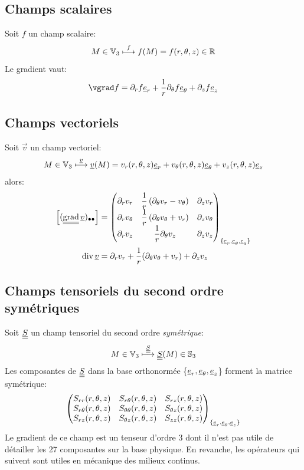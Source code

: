 \documentclass[10pt]{book}
\begin{document}
\begin{appendices}
\subsection{Champs scalaires}
Soit $f$ un champ scalaire:
$$M\in \mathbb{V}_{3}\overset{f}{\longmapsto}f(M)=f(r,\theta,z)\in \mathbb{R}$$
Le gradient vaut:
$$\vgrad f=\partial_{r}f\er+\frac{1}{r}\partial_{\theta}f\etheta+\partial_{z}f\ez$$
\subsection{Champs vectoriels}
Soit $\vec{v}$ un champ vectoriel:
$$M\in \mathbb{V}_{3}\overset{\underline{v}}{\longmapsto}\underline{v}(M)=v_{r}(r,\theta,z)\underline{e}_{r} +v_{\theta}(r,\theta,z)\underline{e}_{\theta}+v_{z}(r,\theta,z)\underline{e}_{z}$$
alors:
\begin{equation}
\begin{aligned}
\left[(\tgrad \vec{v})_{\bullet\bullet}\right]&=
\begin{pmatrix}
\partial_{r}v_{r} & \dfrac{1}{r}\left(\partial_{\theta}v_{r}-v_{\theta}\right) & \partial_{z}v_{r}\\
\partial_{r}v_{\theta}& \dfrac{1}{r}\left(\partial_{\theta}v_{\theta}+v_{r}\right)& \partial_{z}v_{\theta}\\
\partial_{r}v_{z}& \dfrac{1}{r}\partial_{\theta}v_{z} & \partial_{z}v_{z}\\
\end{pmatrix}_{\{\er,\etheta,\ez\}}
\\
\div\vec{v}&=\partial_{r}v_{r}+\frac{1}{r} (\partial_{\theta} \vtheta+v_{r})+\partial_{z}v_{z}
\end{aligned}
\label{eq:formulaire_grad_cyl_vec}
\end{equation}
\subsection{Champs tensoriels du second ordre symétriques}
Soit $\underline{\underline{S}}$ un champ tensoriel du second ordre \emph{symétrique}:
$$M\in \mathbb{V}_{3}\overset{\underline{\underline{S}}}{\longmapsto} \underline{\underline{S}}(M)\in \mathbb{S}_{3}$$
Les composantes de $\underline{\underline{S}}$ dans la base orthonormée \{$\underline{e}_{r},\underline{e}_{\theta}, \underline{e}_{z}$\} forment la matrice symétrique:
$$\begin{pmatrix}
S_{rr}(r,\theta,z) & S_{r\theta}(r,\theta,z) & S_{rz}(r,\theta,z)\\
S_{r\theta}(r,\theta,z) & S_{\theta\theta}(r,\theta,z) & S_{\theta z}(r,\theta,z)\\
S_{rz}(r,\theta,z) & S_{\theta z}(r,\theta,z) & S_{zz}(r,\theta,z)
\end{pmatrix}_{\{\underline{e}_{r},\underline{e}_{\theta},\underline{e}_{z}\}}$$
Le gradient de ce champ est un tenseur d'ordre 3 dont il n'est pas utile de détailler les 27 composantes sur la base physique. En revanche, les opérateurs qui suivent sont utiles en mécanique des milieux continus.\\


\end{appendices}
\end{document}
